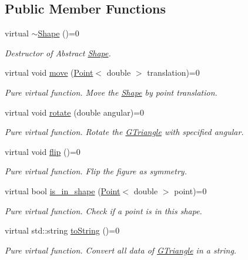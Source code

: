 \subsection*{Public Member Functions}
\begin{DoxyCompactItemize}
\item 
\mbox{\label{classShape_a39fe45638d872f0ce9670d7f85290161}} 
virtual \hyperlink{classShape_a39fe45638d872f0ce9670d7f85290161}{$\sim$\+Shape} ()=0
\begin{DoxyCompactList}\small\item\em Destructor of Abstract \hyperlink{classShape}{Shape}. \end{DoxyCompactList}\item 
virtual void \hyperlink{classShape_a52649731b2cb7b67315882d5e005f7e8}{move} (\hyperlink{classPoint}{Point}$<$ double $>$ translation)=0
\begin{DoxyCompactList}\small\item\em Pure virtual function. Move the \hyperlink{classShape}{Shape} by point translation. \end{DoxyCompactList}\item 
virtual void \hyperlink{classShape_a2dea8616fd40f2d69fd208715921982a}{rotate} (double angular)=0
\begin{DoxyCompactList}\small\item\em Pure virtual function. Rotate the \hyperlink{classGTriangle}{G\+Triangle} with specified angular. \end{DoxyCompactList}\item 
\mbox{\label{classShape_a5a1607f7dc4908225f97aeadb449636d}} 
virtual void \hyperlink{classShape_a5a1607f7dc4908225f97aeadb449636d}{flip} ()=0
\begin{DoxyCompactList}\small\item\em Pure virtual function. Flip the figure as symmetry. \end{DoxyCompactList}\item 
virtual bool \hyperlink{classShape_abcce23128cd35989468a88a7194152af}{is\+\_\+in\+\_\+shape} (\hyperlink{classPoint}{Point}$<$ double $>$ point)=0
\begin{DoxyCompactList}\small\item\em Pure virtual function. Check if a point is in this shape. \end{DoxyCompactList}\item 
virtual std\+::string \hyperlink{classShape_a98fa87c6dc4c7045fd6897a8f3bc186c}{to\+String} ()=0
\begin{DoxyCompactList}\small\item\em Pure virtual function. Convert all data of \hyperlink{classGTriangle}{G\+Triangle} in a string. \end{DoxyCompactList}\end{DoxyCompactItemize}


